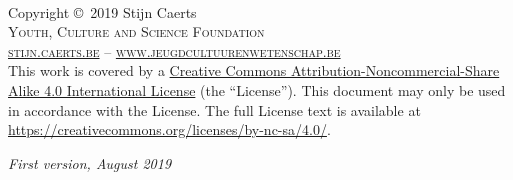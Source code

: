 \documentclass[11pt,fleqn]{book} %
\begin{document}

\begingroup
\thispagestyle{empty} %
\vfill
\endgroup


\newpage
~\vfill
\thispagestyle{empty}
{
\selectfont

\noindent Copyright \copyright\ 2019 Stijn Caerts\\ %

\noindent \textsc{Youth, Culture and Science Foundation}\\ %

\noindent \textsc{\href{https://stijn.caerts.be/}{stijn.caerts.be}} -- \textsc{\href{https://www.jeugdcultuurenwetenschap.be/}{www.jeugdcultuurenwetenschap.be}}\\ %

\noindent This work is covered by a \href{https://creativecommons.org/licenses/by-nc-sa/4.0/deed.nl}{Creative Commons Attribution-Noncommercial-Share Alike 4.0 International License} (the ``License''). This document may only be used in accordance with the License. The full License text is available at \url{https://creativecommons.org/licenses/by-nc-sa/4.0/}.\\

\noindent \href{https://creativecommons.org/licenses/by-nc-sa/4.0/}{\ccbyncsaeu}

\vspace{1cm}

\noindent \textit{First version, August 2019} %
}
\end{document}

